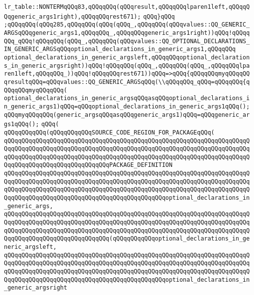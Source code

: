 \verb|lr_table::NONTERMqQQq83,qQQqqQQq(qQQqresult,qQQqqQQqlparen1left,qQQqqQQqgeneric_args1right),qQQqqQQqrest671);|\newline
\verb|qQQq}qQQq|\newline
\verb|;qQQqqQQq(qQQq285,qQQqqQQq(qQQq(qQQq_,qQQqqQQq(qQQqvalues::QQ_GENERIC_ARGSqQQqgeneric_args1,qQQqqQQq_,qQQqqQQqgeneric_args1right))qQQq!qQQqqQQq_qQQq!qQQqqQQq(qQQq_,qQQqqQQq(qQQqvalues::QQ_OPTIONAL_DECLARATIONS_IN_GENERIC_ARGSqQQqoptional_declarations_in_generic_args1,qQQqqQQq|\newline
\verb|optional_declarations_in_generic_argsleft,qQQqqQQqoptional_declarations_in_generic_argsright))qQQq!qQQqqQQq(qQQq_,qQQqqQQq(qQQq_,qQQqqQQqlparen1left,qQQqqQQq_))qQQq!qQQqqQQqrest671))qQQq=>qQQq{qQQqqQQqmyqQQqqQQqresultqQQq=qQQqvalues::QQ_GENERIC_ARGSqQQq(\\qQQqqQQq_qQQq=qQQqqQQq{qQQqqQQqmyqQQqqQQq(|\newline
\verb|optional_declarations_in_generic_argsqQQqasqQQqoptional_declarations_in_generic_args1)qQQq=qQQqoptional_declarations_in_generic_args1qQQq();|\newline
\verb|qQQqmyqQQqqQQq(generic_argsqQQqasqQQqgeneric_args1)qQQq=qQQqgeneric_args1qQQq();|\newline
\verb|qQQq(|\newline
\verb|qQQqqQQqqQQq(qQQqqQQqqQQqSOURCE_CODE_REGION_FOR_PACKAGEqQQq(|\newline
\verb|qQQqqQQqqQQqqQQqqQQqqQQqqQQqqQQqqQQqqQQqqQQqqQQqqQQqqQQqqQQqqQQqqQQqqQQqqQQqqQQqqQQqqQQqqQQqqQQqqQQqqQQqqQQqqQQqqQQqqQQqqQQqqQQqqQQqqQQqqQQqqQQqqQQqqQQqqQQqqQQqqQQqqQQqqQQqqQQqqQQqqQQqqQQqqQQqqQQqqQQqqQQqqQQqqQQqqQQqqQQqqQQqqQQqqQQqqQQqqQQqPACKAGE_DEFINITION|\newline
\verb|qQQqqQQqqQQqqQQqqQQqqQQqqQQqqQQqqQQqqQQqqQQqqQQqqQQqqQQqqQQqqQQqqQQqqQQqqQQqqQQqqQQqqQQqqQQqqQQqqQQqqQQqqQQqqQQqqQQqqQQqqQQqqQQqqQQqqQQqqQQqqQQqqQQqqQQqqQQqqQQqqQQqqQQqqQQqqQQqqQQqqQQqqQQqqQQqqQQqqQQqqQQqqQQqqQQqqQQqqQQqqQQqqQQqqQQqqQQqqQQqqQQqqQQqqQQqqQQqoptional_declarations_in_generic_args,|\newline
\verb|qQQqqQQqqQQqqQQqqQQqqQQqqQQqqQQqqQQqqQQqqQQqqQQqqQQqqQQqqQQqqQQqqQQqqQQqqQQqqQQqqQQqqQQqqQQqqQQqqQQqqQQqqQQqqQQqqQQqqQQqqQQqqQQqqQQqqQQqqQQqqQQqqQQqqQQqqQQqqQQqqQQqqQQqqQQqqQQqqQQqqQQqqQQqqQQqqQQqqQQqqQQqqQQqqQQqqQQqqQQqqQQqqQQqqQQqqQQqqQQq(qQQqqQQqqQQqoptional_declarations_in_generic_argsleft,|\newline
\verb|qQQqqQQqqQQqqQQqqQQqqQQqqQQqqQQqqQQqqQQqqQQqqQQqqQQqqQQqqQQqqQQqqQQqqQQqqQQqqQQqqQQqqQQqqQQqqQQqqQQqqQQqqQQqqQQqqQQqqQQqqQQqqQQqqQQqqQQqqQQqqQQqqQQqqQQqqQQqqQQqqQQqqQQqqQQqqQQqqQQqqQQqqQQqqQQqqQQqqQQqqQQqqQQqqQQqqQQqqQQqqQQqqQQqqQQqqQQqqQQqqQQqqQQqqQQqqQQqoptional_declarations_in_generic_argsright|\newline
